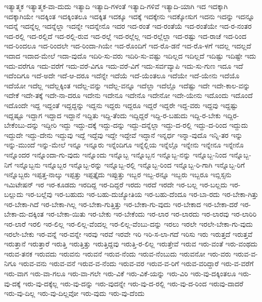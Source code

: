 {ಇತ್ಯಾತ್ಮಕ
ಇತ್ಯಾತ್ಮಕ-ವಾ-ದುದು
ಇತ್ಯಾದಿ
ಇತ್ಯಾದಿ-ಗಳಂತೆ
ಇತ್ಯಾದಿ-ಗಳಿವೆ
ಇತ್ಯಾದಿ-ಯಾಗಿ
ಇದ
ಇದಕ್ಕಾಗಿ
ಇದಕ್ಕಾಗಿಯೇ
ಇದಕ್ಕಿಂತ
ಇದಕ್ಕಿಂತಲೂ
ಇದಕ್ಕಿತ
ಇದಕ್ಕೂ
ಇದಕ್ಕೆ
ಇದಕ್ಕೇನು
ಇದಕ್ಕೋಸುಗ
ಇದನು
ಇದನ್ನು
ಇದನ್ನೂ
ಇದನ್ನೆ
ಇದನ್ನೆಲ್ಲ
ಇದನ್ನೆಲ್ಲಾ
ಇದನ್ನೇ
ಇದನ್ನೇನೊ
ಇದರ
ಇದ-ರಂತೆ
ಇದ-ರಂತೆಯೆ
ಇದ-ರಂತೆಯೇ
ಇದ-ರ-ನಂತರ
ಇದ-ರಲ್ಲಿ
ಇದ-ರಲ್ಲಿದೆ
ಇದ-ರಲ್ಲಿ-ರುವ
ಇದ-ರಲ್ಲೆ
ಇದ-ರಲ್ಲೆಲ್ಲ
ಇದ-ರಲ್ಲೆಲ್ಲಾ
ಇದ-ರಷ್ಟು
ಇದ-ರಾಚೆ
ಇದ-ರಿಂದ
ಇದ-ರಿಂದಲೂ
ಇದ-ರಿಂದಲೇ
ಇದ-ರಿಂದಾ-ಗಿಯೇ
ಇದ-ರೊಂದಿಗೆ
ಇದ-ರೊ-ಡನೆ
ಇದ-ರೊ-ಳಗೆ
ಇದಲ್ಲ
ಇದಲ್ಲದೆ
ಇದಾದ
ಇದಾದ-ಮೇಲೆ
ಇದಾ-ವುದೊ
ಇದಿರಿ-ಸು-ವರು
ಇದಿರಿ-ಸು-ವಷ್ಟು
ಇದಿಲ್ಲದ
ಇದಿಲ್ಲದೆ
ಇದಿಷ್ಟು
ಇದಿಷ್ಟೇ
ಇದು
ಇದು-ವರೆಗೂ
ಇದು-ವರೆಗೆ
ಇದು-ವರೆ-ವಿಗೂ
ಇದು-ವರೆ-ವಿಗೆ
ಇದು-ಸರ್ವವ್ಯಾಪಿ
ಇದು-ಸು-ಗುಣ
ಇದೂ
ಇದೆ
ಇದೆಂದಿಗೂ
ಇದೆ-ಅದೇ
ಇದೆ-ಆ-ದರೂ
ಇದೆನ್ನೇ
ಇದೆಯೆ
ಇದೆ-ಯೆಂತಲೂ
ಇದೆಯೇ
ಇದೆ-ಯೇನು
ಇದೆಯೊ
ಇದೆಯೋ
ಇದೆಲ್ಲ
ಇದೆಲ್ಲಕ್ಕಿಂತ
ಇದೆಲ್ಲ-ವನ್ನು
ಇದೆಲ್ಲ-ವನ್ನೂ
ಇದೆಲ್ಲಾ
ಇದೆಲ್ಲೊ
ಇದೆಷ್ಟು
ಇದೇ
ಇದೇ-ಕಾಲ-ವನ್ನು
ಇದೇಕೆ
ಇದೇ-ತಕ್ಕೆ
ಇದೇ-ನಾ-ದರೂ
ಇದೇನು
ಇದೇನೂ
ಇದೇನೊ
ಇದೇನೋ
ಇದೇ-ಯೇನು
ಇದೊಂದು
ಇದೊಂದೆ
ಇದೊಂದೇ
ಇದ್ದ
ಇದ್ದಂತೆ
ಇದ್ದದ್ದನ್ನು
ಇದ್ದನು
ಇದ್ದರು
ಇದ್ದರೂ
ಇದ್ದರೆ
ಇದ್ದರೇ
ಇದ್ದ-ವರು
ಇದ್ದವು
ಇದ್ದಷ್ಟು
ಇದ್ದಷ್ಟೂ
ಇದ್ದಾಗ
ಇದ್ದಾದ
ಇದ್ದಾನೆ
ಇದ್ದಿತು
ಇದ್ದಿ-ತೆಂದು
ಇದ್ದಿದ್ದರೆ
ಇದ್ದಿ-ರ-ಬಹುದು
ಇದ್ದಿ-ರ-ಬೇಕು
ಇದ್ದಿರ-ಬೇಕೆಂಬು-ದನ್ನು
ಇದ್ದೀರಿ
ಇದ್ದು
ಇದ್ದು-ದಕ್ಕೆ
ಇದ್ದು-ದನ್ನು
ಇದ್ದು-ದನ್ನೆಲ್ಲಾ
ಇದ್ದು-ದ-ರಲ್ಲಿ
ಇದ್ದು-ದ-ರಿಂದ
ಇದ್ದುದು
ಇದ್ದುದೇ
ಇದ್ದು-ದೇನು
ಇದ್ದುವು
ಇದ್ದೆ
ಇದ್ದೆವು
ಇದ್ದೇ
ಇದ್ದೇವೆ
ಇದ್ಧಾನೆ
ಇನ್ನರ್ಧ
ಇನ್ನಾ-ವುದೊ
ಇನ್ನಿ-ತರ
ಇನ್ನು
ಇನ್ನು-ಮುಂದೆ
ಇನ್ನು-ಮೇಲೆ
ಇನ್ನೂ
ಇನ್ನೂರು
ಇನ್ನೆಂದಿಗೂ
ಇನ್ನೆಲ್ಲಿಯ
ಇನ್ನೆಲ್ಲೊ
ಇನ್ನೇನು
ಇನ್ನೇನೂ
ಇನ್ನೇನೊ
ಇನ್ನೊಂದರ
ಇನ್ನೊಂದಾ-ಗು-ವುದು
ಇನ್ನೊಂದು
ಇನ್ನೊಬ್ಬ
ಇನ್ನೊಬ್ಬನ
ಇನ್ನೊಬ್ಬ-ನನ್ನು
ಇನ್ನೊಬ್ಬ-ನಿಂದ
ಇನ್ನೊಬ್ಬ-ನಿಗೆ
ಇನ್ನೊಬ್ಬನು
ಇನ್ನೊಬ್ಬರ
ಇನ್ನೊಬ್ಬ-ರನ್ನು
ಇನ್ನೊಬ್ಬ-ರಲ್ಲಿ
ಇನ್ನೊಬ್ಬ-ರಿಂದ
ಇನ್ನೊಬ್ಬ-ರಿ-ಗಾಗಿ
ಇನ್ನೊಬ್ಬ-ರಿಗೆ
ಇನ್ನೊಬ್ಬರು
ಇಪ್ಪತ್ತ-ನಾಲ್ಕು
ಇಪ್ಪತ್ತು
ಇಪ್ಪತ್ತೈದು
ಇಪ್ಪುತ್ತು
ಇಬ್ಬರ
ಇಬ್ಬ-ರನ್ನೂ
ಇಬ್ಬರು
ಇಬ್ಬರೂ
ಇಬ್ಲಿಸ್ಸನು
ಇಮಿಟೇಷನ್
ಇರ
ಇರ-ಕೂಡದು
ಇರದಿದ್ದ
ಇರ-ದಿದ್ದರೆ
ಇರದು
ಇರದೆ
ಇರದೇ
ಇರ-ಬಲ್ಲ
ಇರ-ಬಲ್ಲದು
ಇರ-ಬಲ್ಲುದು
ಇರ-ಬಲ್ಲೆವು
ಇರ-ಬಹುದು
ಇರ-ಬಹು-ದುಜ್ಯೋತಿಯ
ಇರ-ಬಹು-ದೆಂದೂ
ಇರ-ಬಾ-ರದು
ಇರ-ಬೇಕಾ-ಗಿತ್ತು
ಇರ-ಬೇಕಾ-ಗಿದೆ
ಇರ-ಬೇಕಾ-ಗಿಲ್ಲ
ಇರ-ಬೇಕಾ-ಗುತ್ತಿತ್ತು
ಇರ-ಬೇಕಾ-ಗು-ವುದು
ಇರ-ಬೇಕಾದ
ಇರ-ಬೇಕಾ-ದರೆ
ಇರ-ಬೇಕಾ-ದು-ದಕ್ಕಿಂತ
ಇರ-ಬೇಕಾ-ಯಿತು
ಇರ-ಬೇಕು
ಇರ-ಬೇಕೆಂದು
ಇರ-ಲಾರ
ಇರ-ಲಾರದು
ಇರ-ಲಾರವು
ಇರ-ಲಾರಿರಿ
ಇರ-ಲಾರೆ
ಇರಲಿ
ಇರ-ಲಿಲ್ಲ
ಇರ-ಲಿಲ್ಲ-ವೆಂದಲ್ಲ
ಇರ-ಲಿಲ್ಲ-ವೆಂಬು-ದನ್ನು
ಇರಲು
ಇರಲೇ
ಇರಲೇ-ಬೇಕಾ-ಗು-ವುದು
ಇರಲೇ-ಬೇಕು
ಇರ-ವನ್ನೆ
ಇರ-ವನ್ನೇ
ಇರವು
ಇರವೆ
ಇರವೇ
ಇರಿ
ಇರಿ-ಸ-ಲಾ-ಗದೆ
ಇರಿಸು
ಇರು
ಇರುತ್ತದೆ
ಇರುತ್ತವೆ
ಇರುತ್ತಾನೆ
ಇರುತ್ತಾರೆ
ಇರುತ್ತಿ
ಇರುತ್ತಿತ್ತು
ಇರುತ್ತಿದ್ದವು
ಇರುತ್ತಿ-ರ-ಲಿಲ್ಲ
ಇರುತ್ತೇವೆ
ಇರುವ
ಇರು-ವಂತೆ
ಇರು-ವಂಥದು
ಇರುವ-ತನಕ
ಇರುವದು
ಇರುವನು
ಇರುವನೆ
ಇರುವ-ನೆಂದು
ಇರುವ-ನೆಂಬುದು
ಇರುವನೋ
ಇರು-ವರು
ಇರುವ-ವ-ನಿಗೂ
ಇರುವ-ವನು
ಇರುವ-ವನೆ
ಇರುವ-ವ-ನೆಂದು
ಇರುವ-ವರ
ಇರುವ-ವ-ರಿಗೆ
ಇರುವ-ವರಿದ್ದಾರೆ
ಇರು-ವ-ವರೆಗೆ
ಇರು-ವಾಗ
ಇರು-ವಾ-ಗಲೂ
ಇರು-ವಾ-ಗಲೇ
ಇರು-ವಿಕೆ
ಇರು-ವಿಕೆ-ಯನ್ನು
ಇರು-ವಿರಿ
ಇರು-ವು-ದಕ್ಕಿಂತಲೂ
ಇರು-ವು-ದಕ್ಕೆ
ಇರು-ವು-ದಕ್ಕೆಲ್ಲ
ಇರು-ವು-ದನ್ನು
ಇರು-ವುದನ್ನೇ
ಇರು-ವು-ದ-ರಲ್ಲಿ
ಇರು-ವು-ದ-ರಿಂದ
ಇರುವು-ದಾದರೆ
ಇರು-ವು-ದಿಲ್ಲ
ಇರು-ವು-ದಿಲ್ಲವೋ
ಇರು-ವುದು
ಇರು-ವು-ದೆಂದು
}
